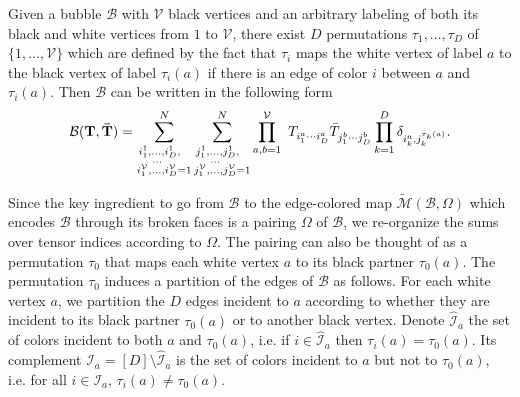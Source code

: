 \documentclass[aps,prd,10pt,notitlepage,nofootinbib,superscriptaddress,showkeys,showpacs]{revtex4-1}
\begin{document}
Given a bubble ${\mathcal{B}}$ with ${\mathcal{V}}$ black vertices and an arbitrary labeling of both its black and white vertices from $1$ to ${\mathcal{V}}$, there exist $D$ permutations $\tau_1, \dotsc, \tau_D$ of $\{1, \dotsc, {\mathcal{V}}\}$ which are defined by the fact that $\tau_i$ maps the white vertex of label $a$ to the black vertex of label $\tau_i(a)$ if there is an edge of color $i$ between $a$ and $\tau_i(a)$. Then ${\mathcal{B}}$ can be written in the following form
\begin{equation}
{\mathcal{B}}({\bf T}, {\bf \bar T})= 
 \sum_{  \substack {  { i^1_{1},\dotsc, i^1_{D},\ \   }   \\ {\dotsc\ \ \ }  \\ { i^{\mathcal{V}}_{1},\dotsc, i^{\mathcal{V}}_{D}=1  }  }   }^N
 \sum_{  \substack {  { j^1_{1},\dotsc,j^1_{D},\ \   }   \\ {\dotsc\ \ \ }  \\ { j^{\mathcal{V}}_{1},\dotsc, j^{\mathcal{V}}_{D}=1  }  }   }^N  
 \prod_{a,b=1}^{\mathcal{V}}\ T^{}_{i^a_1 \dotsb i^a_D}\bar T^{}_{j^b_{1} \dotsb j^b_{D}}
 \prod_{k=1}^D\delta_{i_k^a, j_k^{\tau_{k}(a)}}.
\end{equation}

Since the key ingredient to go from ${\mathcal{B}}$ to the edge-colored map $\tilde{\mathcal{M}}({\mathcal{B}}, \Omega)$ which encodes ${\mathcal{B}}$ through its broken faces is a pairing $\Omega$ of ${\mathcal{B}}$, we re-organize the sums over tensor indices according to $\Omega$. The pairing can also be thought of as a permutation $\tau_0$ that maps each white vertex $a$ to its black partner $\tau_0(a)$. The permutation $\tau_0$ induces a partition of the edges of ${\mathcal{B}}$ as follows. For each white vertex $a$, we partition the $D$ edges incident to $a$ according to whether they are incident to its black partner $\tau_0(a)$ or to another black vertex. Denote ${\widehat{\mathcal{I}}}_a$ the set of colors incident to both $a$ and $\tau_0(a)$, i.e. if $i\in{\widehat{\mathcal{I}}}_a$ then $\tau_i(a)=\tau_0(a)$. Its complement ${\mathcal{I}}_a = [D]\setminus {\widehat{\mathcal{I}}}_a$ is the set of colors incident to $a$ but not to $\tau_0(a)$, i.e. for all $i\in{\mathcal{I}}_a$, $\tau_i(a)\neq \tau_0(a)$.
\end{document}
